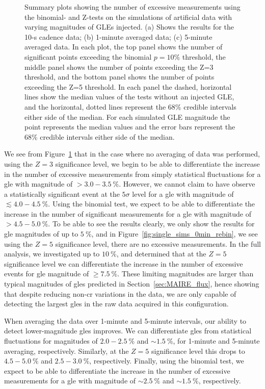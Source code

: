\begin{figure}[!htbp!]
	\caption{Summary plots showing the number of excessive measurements using the binomial- and Z-tests on the simulations of artificial data with varying magnitudes of GLEs injected. (a) Shows the results for the 10-s cadence data; (b) 1-minute averaged data; (c) 5-minute averaged data. In each plot, the top panel shows the number of significant points exceeding the binomial $p = 10 \%$ threshold, the middle panel shows the number of points exceeding the Z=3 threshold, and the bottom panel shows the number of points exceeding the Z=5 threshold. In each panel the dashed, horizontal lines show the median values of the tests without an injected GLE, and the horizontal, dotted lines represent the $68 \%$ credible intervals either side of the median. For each simulated GLE magnitude the point represents the median values and the error bars represent the $68 \%$ credible intervals either side of the median.}
	\label{fig:single_HS14008_sims}
\end{figure}

We see from Figure~\ref{fig:single_HS14008_sims} that in the case where no averaging of data was performed, using the $Z=3$ significance level, we begin to be able to differentiate the increase in the number of excessive measurements from simply statistical fluctuations for a \gls{gle} with magnitude of $>3.0-3.5~\%$. However, we cannot claim to have observe a statistically significant event at the $5\sigma$ level for a \gls{gle} with magnitude of $\lesssim4.0-4.5~\%$. Using the binomial test, we expect to be able to differentiate the increase in the number of significant measurements for a \gls{gle} with magnitude of $>4.5-5.0~\%$. To be able to see the results clearly, we only show the results for \gls{gle} magnitudes of up to $5~\%$, and in Figure~\ref{fig:single_sims_0min_rebin}, we see using the $Z=5$ significance level, there are no excessive measurements. In the full analysis, we investigated up to $10~\%$, and determined that at the $Z=5$ significance level we can differentiate the increase in the number of excessive events for \gls{gle} magnitude of $\geq7.5~\%$. These limiting magnitudes are larger than typical magnitudes of \glspl{gle} predicted in Section~\ref{sec:MAIRE_flux}, hence showing that despite reducing non-\gls{cr} variations in the data, we are only capable of detecting the largest \glspl{gle} in the raw data acquired in this configuration.

When averaging the data over 1-minute and 5-minute intervals, our ability to detect lower-magnitude \glspl{gle} improves. We can differentiate \glspl{gle} from statistical fluctuations for magnitudes of $2.0-2.5~\%$ and $\sim1.5~\%$, for 1-minute and 5-minute averaging, respectively. Similarly, at the $Z=5$ significance level this drops to $4.5-5.0~\%$ and $2.5-3.0~\%$, respectively. Finally, using the binomial test, we expect to be able to differentiate the increase in the number of excessive measurements for a \gls{gle} with magnitude of $\sim2.5~\%$ and $\sim1.5~\%$, respectively.

